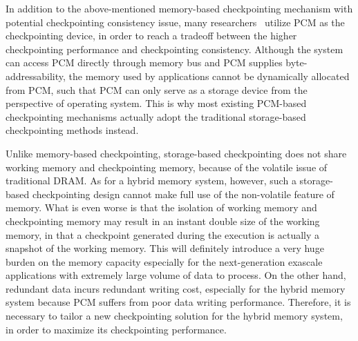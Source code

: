 \documentclass[conference]{IEEEtran}
\begin{document}


In addition to the above-mentioned memory-based checkpointing mechanism with potential checkpointing consistency issue, many researchers~\cite{dong_leveraging_2009, kannan_optimizing_2013, gao_real-time_2015} utilize PCM as the checkpointing device, in order to reach a tradeoff between the higher checkpointing performance and checkpointing consistency.
Although the system can access PCM directly through memory bus and PCM supplies byte-addressability, the memory used by applications cannot be dynamically allocated from PCM, such that PCM can only serve as a storage device from the perspective of operating system.
This is why most existing PCM-based checkpointing mechanisms actually adopt the traditional storage-based checkpointing methods instead.

Unlike memory-based checkpointing, storage-based checkpointing does not share working memory and checkpointing memory, because of the volatile issue of traditional DRAM.
As for a hybrid memory system, however, such a storage-based checkpointing design cannot make full use of the non-volatile feature of memory. What is even worse is that the isolation of working memory and checkpointing memory may result in an instant double size of the working memory, in that a checkpoint generated during the execution is actually a snapshot of the working memory. This will definitely introduce a very huge burden on the memory capacity especially for the next-generation exascale applications with extremely large volume of data to process.
On the other hand, redundant data incurs redundant writing cost, especially for the hybrid memory system because PCM suffers from poor data writing performance. Therefore, it is necessary to tailor a new checkpointing solution for the hybrid memory system, in order to maximize its checkpointing performance. 
\end{document}
